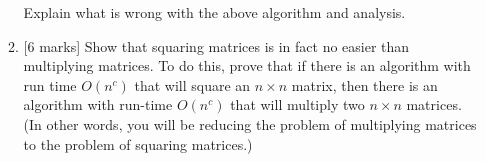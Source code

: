 \documentclass[11pt]{article}
\begin{document}
\begin{enumerate}
\begin{enumerate}
Explain what is wrong with the above algorithm and analysis. 


\item{} [6 marks]  Show that squaring matrices is in fact no easier than multiplying matrices.  To do this, prove that if there is an algorithm with run time $O(n^c)$ that will square an $n \times n$ matrix, then there is an algorithm with run-time $O(n^c)$ that will multiply two $n \times n$ matrices.
(In other words, you will be reducing the problem of multiplying matrices to the problem of squaring matrices.)   


\end{enumerate}

\end{enumerate}
\end{document}
